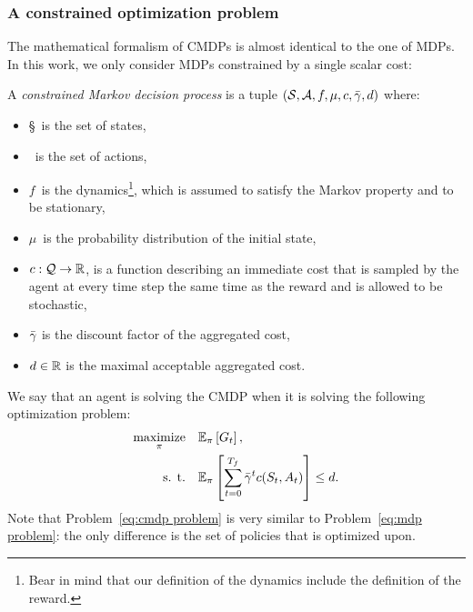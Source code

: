 		\subsubsection{A constrained optimization problem}
		The mathematical formalism of CMDPs is almost identical to the one of MDPs. In this work, we only consider MDPs constrained by a single scalar cost:
		\begin{definition}
			A \emph{constrained Markov decision process} is a tuple $(\mathcal{S}, \mathcal{A}, f, \mu, c, \bar{\gamma}, d)$ where:
			\begin{itemize}
				\item \S~is the set of states,
				\item \A~is the set of actions,
				\item $f$~is the dynamics\footnote{Bear in mind that our definition of the dynamics include the definition of the reward.}, which is assumed to satisfy the Markov property and to be stationary,
				\item $\mu$~is the probability distribution of the initial state,
				\item $c: \mathcal{Q}\to \mathbb{R}$, is a function describing an immediate cost that is sampled by the agent at every time step the same time as the reward and is allowed to be stochastic,
				\item $\bar{\gamma}$ is the discount factor of the aggregated cost,
				\item $d \in \mathbb{R}$ is the maximal acceptable aggregated cost.
			\end{itemize}
		\end{definition}
		We say that an agent is solving the CMDP when it is solving the following optimization problem:
		\begin{equation}
		\begin{aligned}
			\underset{\pi}{\text{maximize}} & \quad\mathbb{E}_\pi\left[G_t\right], \\
			\text{s. t.} & \quad\mathbb{E}_\pi\left[\sum_{t=0}^{{T_f}}\bar{\gamma}^tc(S_t, A_t)\right] \leq d.
		\end{aligned} \label{eq:cmdp problem}
		\end{equation}
		Note that Problem~\eqref{eq:cmdp problem} is very similar to Problem~\eqref{eq:mdp problem}: the only difference is the set of policies that is optimized upon. 
		
